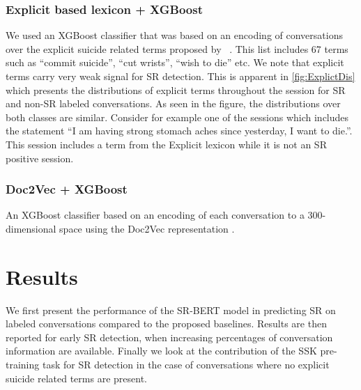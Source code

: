 \documentclass[letterpaper]{article} %
\begin{document}
  \subsubsection{Explicit based lexicon + XGBoost} 
We used an XGBoost classifier that was based on an encoding  of conversations over the explicit suicide related terms proposed by ~\citet{amir}. This  list  includes 67 terms such as ``commit suicide'', ``cut wrists'', ``wish to die'' etc. 
We note that explicit terms carry very weak signal for SR detection.  This is apparent in
\autoref{fig:ExplictDis} which presents the distributions of explicit terms throughout the session for SR and non-SR labeled  conversations. As seen in the figure, the distributions over both classes are similar.  
Consider for example one of the sessions which includes the statement ``I am having strong stomach aches since yesterday, I want to die.''. This session includes a term from the Explicit lexicon while it is not an SR positive session. 

 
\subsubsection{Doc2Vec + XGBoost} 
An XGBoost classifier based on an encoding of each conversation to a 300-dimensional space using the Doc2Vec representation\cite{doc2vec} .

\section{Results}
We first present the performance of the SR-BERT model in predicting SR on labeled conversations compared to the proposed baselines. 
Results are then reported for early SR detection, when increasing percentages of conversation information are available. Finally we look at the contribution of the SSK pre-training task for SR detection in the case of conversations where no explicit suicide related terms are present. 
\end{document}
